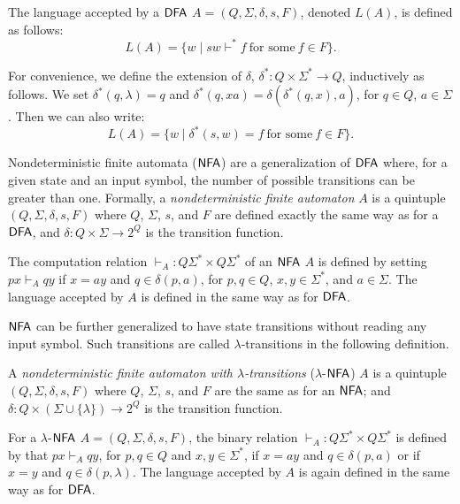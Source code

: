 The language accepted by a \index{$\DFA$}$\DFA$ $A = (Q, \Sigma, \delta, s, F)$, denoted $L(A)$, is defined as follows: $$L(A) = \{w \mid sw \vdash^* f \ \text{for some} \ f \in F\}.$$

For convenience, we define the extension of $\delta$, $\delta^*: Q \times \Sigma^* \to Q$, inductively as follows. We set $\delta^*(q, \lambda) = q$ and $\delta^*(q, xa) = \delta(\delta^*(q, x), a)$, for $q \in Q$, $a \in \Sigma$. Then we can also write: $$L(A) = \{w \mid \delta^*(s, w) = f \ \text{for some} \ f \in F\}.$$

Nondeterministic finite automata \index{$\NFA$}($\NFA$) are a generalization of \index{$\DFA$}$\DFA$ where, for a given state and an input symbol, the number of possible transitions can be greater than one. Formally, a  \emph{nondeterministic finite automaton} $A$ is a quintuple $(Q, \Sigma, \delta, s, F)$ where $Q$, $\Sigma$, $s$, and $F$ are defined exactly the same way as for a \index{$\DFA$}$\DFA$, and $\delta: Q \times \Sigma \to 2^Q$ is the transition function.

The computation relation $\vdash_A: Q \Sigma^* \times Q \Sigma^*$ of an \index{$\NFA$}$\NFA$ $A$ is defined by setting $px \vdash_A qy$ if $x = ay$ and $q \in \delta(p, a)$, for $p, q \in Q$, $x, y \in \Sigma^*$, and $a \in \Sigma$. The language accepted by $A$ is defined in the same way as for \index{$\DFA$}$\DFA$.

\index{$\NFA$}$\NFA$ can be further generalized to have state transitions without reading any input symbol. Such transitions are called  $\lambda$-transitions in the following definition.

A \emph{nondeterministic finite automaton with $\lambda$-transitions} \index{$\lambda$-$\NFA$}($\lambda$-$\NFA$) $A$ is a quintuple $(Q, \Sigma, \delta, s, F)$ where $Q$, $\Sigma$, $s$, and $F$ are the same as for an \index{$\NFA$}$\NFA$; and $\delta: Q \times (\Sigma \cup \{\lambda\}) \to 2^Q$ is the transition function.

For a \index{$\lambda$-$\NFA$}$\lambda$-$\NFA$ $A = (Q, \Sigma, \delta, s, F)$, the binary relation $\vdash_A: Q \Sigma^* \times Q \Sigma^*$ is defined by that $px \vdash_A qy$, for $p, q \in Q$ and $x, y \in \Sigma^*$, if $x = ay$ and $q \in \delta(p, a)$ or if $x = y$ and $q \in \delta(p, \lambda)$. The language accepted by $A$ is again defined in the same way as for \index{$\DFA$}$\DFA$.

